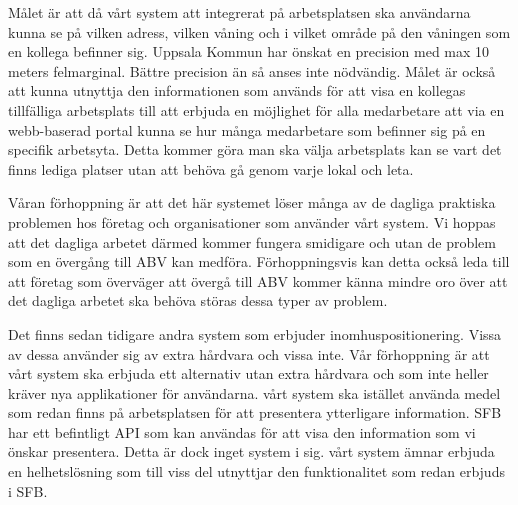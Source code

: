 \documentclass[swedish, a4paper,12pt]{article}
\begin{document}
Målet är att då vårt system att integrerat på arbetsplatsen ska användarna kunna se på vilken adress, vilken våning och i vilket område på den våningen som en kollega befinner sig. Uppsala Kommun har önskat en precision med max 10 meters felmarginal. Bättre precision än så anses inte nödvändig. Målet är också att kunna utnyttja den informationen som används för att visa en kollegas tillfälliga arbetsplats till att erbjuda en möjlighet för alla medarbetare att via en webb-baserad portal kunna se hur många medarbetare som befinner sig på en specifik arbetsyta. Detta kommer göra man ska välja arbetsplats kan se vart det finns lediga platser utan att behöva gå genom varje lokal och leta.

Våran förhoppning är att det här systemet löser många av de dagliga praktiska problemen hos företag och organisationer som använder vårt system. Vi hoppas att det dagliga arbetet därmed kommer fungera smidigare och utan de problem som en övergång till ABV kan medföra. Förhoppningsvis kan detta också leda till att företag som överväger att övergå till ABV kommer känna mindre oro över att det dagliga arbetet ska behöva störas dessa typer av problem.

Det finns sedan tidigare andra system som erbjuder inomhuspositionering. Vissa av dessa använder sig av extra hårdvara och vissa inte. Vår förhoppning är att vårt system ska erbjuda ett alternativ utan extra hårdvara och som inte heller kräver nya applikationer för användarna. vårt system ska istället använda medel som redan finns på arbetsplatsen för att presentera ytterligare information.
SFB har ett befintligt API som kan användas för att visa den information som vi önskar presentera. Detta är dock inget system i sig. vårt system ämnar erbjuda en helhetslösning som till viss del utnyttjar den funktionalitet som redan erbjuds i SFB.







\end{document}
